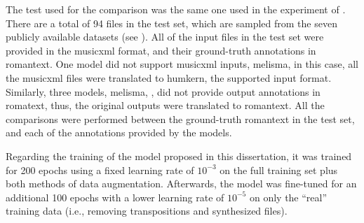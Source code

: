 
The test used for the comparison was the same one used in
the experiment of .
There are a total of 94 files in the test set, which are
sampled from the seven publicly available datasets (see
). All of the input files
in the test set were provided in the \gls{musicxml} format,
and their ground-truth annotations in \gls{romantext}. One
model did not support \gls{musicxml} inputs, \gls{melisma},
in this case, all the \gls{musicxml} files were translated
to \gls{humkern}, the supported input format. Similarly,
three models, \gls{melisma}, \textcite{chen2021attend,
mcleod2021modular}, did not provide output annotations in
\gls{romatext}, thus, the original outputs were translated
to \gls{romantext}. All the comparisons were performed
between the ground-truth \gls{romantext} in the test set,
and each of the annotations provided by the models. 

Regarding the training of the model proposed in this
dissertation, it was trained for 200 epochs using a fixed
learning rate of $10^{-3}$ on the full training set plus
both methods of data augmentation. Afterwards, the model was
fine-tuned for an additional 100 epochs with a lower
learning rate of $10^{-5}$ on only the ``real'' training
data (i.e., removing transpositions and synthesized files).

